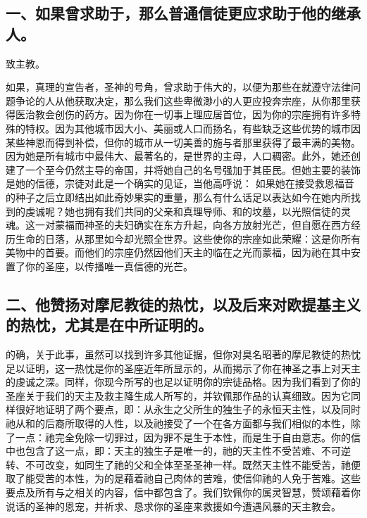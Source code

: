 \par


\subsection{一、如果曾求助于，那么普通信徒更应求助于他的继承人。}

致主教。\par

如果，真理的宣告者，圣神的号角，曾求助于伟大的，以便为那些在就遵守法律问题争论的人从他获取决定，那么我们这些卑微渺小的人更应投奔宗座，从你那里获得医治教会创伤的药方。因为你在一切事上理应居首位，因为你的宗座拥有许多特殊的特权。因为其他城市因大小、美丽或人口而扬名，有些缺乏这些优势的城市因某些神恩而得到补偿，但你的城市从一切美善的施与者那里获得了最丰满的美物。因为她是所有城市中最伟大、最著名的，是世界的主母，人口稠密。此外，她还创建了一个至今仍然主导的帝国，并将她自己的名号强加于其臣民。但她主要的装饰是她的信德，宗徒对此是一个确实的见证，当他高呼说： 如果她在接受救恩福音的种子之后立即结出如此奇妙果实的重量，那么有什么话足以表达如今在她内所找到的虔诚呢？她也拥有我们共同的父亲和真理导师、和的坟墓，以光照信徒的灵魂。这一对蒙福而神圣的夫妇确实在东方升起，向各方放射光芒，但自愿在西方经历生命的日落，从那里如今却光照全世界。这些使你的宗座如此荣耀：这是你所有美物中的首要。而他们的宗座仍然因他们天主的临在之光而蒙福，因为祂在其中安置了你的圣座，以传播唯一真信德的光芒。\par


\subsection{二、他赞扬对摩尼教徒的热忱，以及后来对欧提基主义的热忱，尤其是在中所证明的。}

的确，关于此事，虽然可以找到许多其他证据，但你对臭名昭著的摩尼教徒的热忱足以证明，这一热忱是你的圣座近年所显示的，从而揭示了你在神圣之事上对天主的虔诚之深。同样，你现今所写的也足以证明你的宗徒品格。因为我们看到了你的圣座关于我们的天主及救主降生成人所写的，并钦佩那作品的认真细致。因为它同样很好地证明了两个要点，即：从永生之父所生的独生子的永恒天主性，以及同时祂从和的后裔所取得的人性，以及祂接受了一个在各方面都与我们相似的本性，除了一点：祂完全免除一切罪过，因为罪不是生于本性，而是生于自由意志。你的信中也包含了这一点，即：天主的独生子是唯一的，祂的天主性不受苦难、不可逆转、不可改变，如同生了祂的父和全体至圣圣神一样。既然天主性不能受苦，祂便取了能受苦的本性，为的是藉着祂自己肉体的苦难，使信仰祂的人免于苦难。这些要点及所有与之相关的内容，信中都包含了。我们钦佩你的属灵智慧，赞颂藉着你说话的圣神的恩宠，并祈求、恳求你的圣座来救援如今遭遇风暴的天主教会。\par

